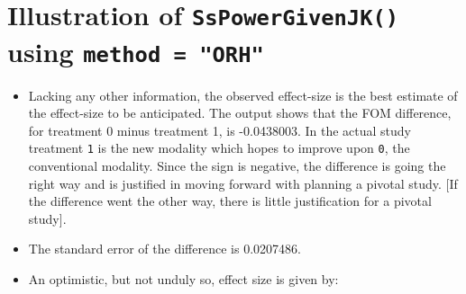 \documentclass[]{book}
\newenvironment{Shaded}{\begin{snugshade}}{\end{snugshade}}
\newcommand{\CommentTok}[1]{\textcolor[rgb]{0.56,0.35,0.01}{\textit{#1}}}
\newcommand{\DataTypeTok}[1]{\textcolor[rgb]{0.13,0.29,0.53}{#1}}
\newcommand{\DecValTok}[1]{\textcolor[rgb]{0.00,0.00,0.81}{#1}}
\newcommand{\KeywordTok}[1]{\textcolor[rgb]{0.13,0.29,0.53}{\textbf{#1}}}
\newcommand{\NormalTok}[1]{#1}
\newcommand{\OperatorTok}[1]{\textcolor[rgb]{0.81,0.36,0.00}{\textbf{#1}}}
\newcommand{\StringTok}[1]{\textcolor[rgb]{0.31,0.60,0.02}{#1}}
\begin{document}
\hypertarget{illustration-of-sspowergivenjk-using-method-orh-1}{%
\section{\texorpdfstring{Illustration of \texttt{SsPowerGivenJK()} using \texttt{method\ =\ "ORH"}}{Illustration of SsPowerGivenJK() using method = "ORH"}}\label{illustration-of-sspowergivenjk-using-method-orh-1}}

\begin{Shaded}
\end{Shaded}

\begin{itemize}
\item
  Lacking any other information, the observed effect-size is the best estimate of the effect-size to be anticipated. The output shows that the FOM difference, for treatment 0 minus treatment 1, is -0.0438003. In the actual study treatment \texttt{1} is the new modality which hopes to improve upon \texttt{0}, the conventional modality. Since the sign is negative, the difference is going the right way and is justified in moving forward with planning a pivotal study. {[}If the difference went the other way, there is little justification for a pivotal study{]}.
\item
  The standard error of the difference is 0.0207486.
\item
  An optimistic, but not unduly so, effect size is given by:
\end{itemize}

\begin{Shaded}
\end{Shaded}
\end{document}
